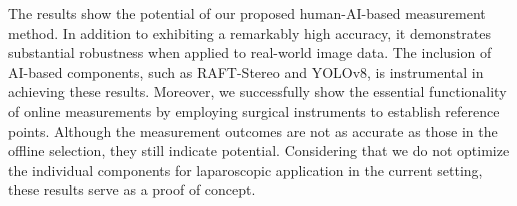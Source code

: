 \documentclass[letterpaper]{article} %
\begin{document}
The results show the potential of our proposed human-AI-based measurement method. In addition to exhibiting a remarkably high accuracy, it demonstrates substantial robustness when applied to real-world image data. The inclusion of AI-based components, such as RAFT-Stereo and YOLOv8, is instrumental in achieving these results. Moreover, we successfully show the essential functionality of online measurements by employing surgical instruments to establish reference points. Although the measurement outcomes are not as accurate as those in the offline selection, they still indicate potential. Considering that we do not optimize the individual components for laparoscopic application in the current setting, these results serve as a proof of concept. %



\end{document}

